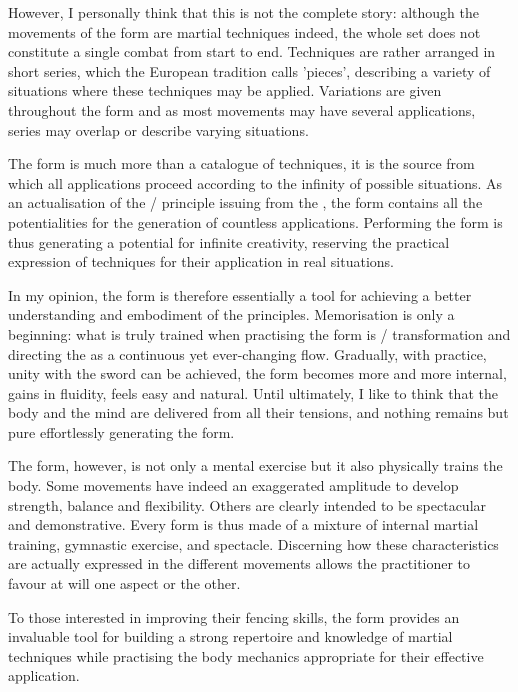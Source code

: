 However, I personally think that this is not the complete story: although the movements of the form are martial techniques indeed, the whole set does not constitute a single combat from start to end. Techniques are rather arranged in short series, which the European tradition calls 'pieces', describing a variety of situations where these techniques may be applied. Variations are given throughout the form and as most movements may have several applications, series may overlap or describe varying situations.

The form is much more than a catalogue of techniques, it is the source from which all applications proceed according to the infinity of possible situations. As an actualisation of the \Yin{}/\Yang{} principle issuing from the \Taiji{}, the \Taijijian{} form contains all the potentialities for the generation of countless applications. Performing the form is thus generating a potential for infinite creativity, reserving the practical expression of techniques for their application in real situations.

In my opinion, the form is therefore essentially a tool for achieving a better understanding and embodiment of the \Taiji{} principles. 
Memorisation is only a beginning: what is truly trained when practising the form is \Yin{}/\Yang{} transformation and directing the \Yi{} as a continuous yet ever-changing flow.
Gradually, with practice, unity with the sword can be achieved, the form becomes more and more internal, gains in fluidity, feels easy and natural. 
Until ultimately, I like to think that the body and the mind are delivered from all their tensions, and nothing remains but pure \Yi{} effortlessly generating the form.

The form, however, is not only a mental exercise but it also physically trains the body.
Some movements have indeed an exaggerated amplitude to develop strength, balance and flexibility.
Others are clearly intended to be spectacular and demonstrative. 
Every \Taijijian{} form is thus made of a mixture of internal martial training, gymnastic exercise, and spectacle.
Discerning how these characteristics are actually expressed in the different movements allows the practitioner to favour at will one aspect or the other.

To those interested in improving their fencing skills, the form provides an invaluable tool for building a strong repertoire and knowledge of martial techniques while practising the body mechanics appropriate for their effective application.

